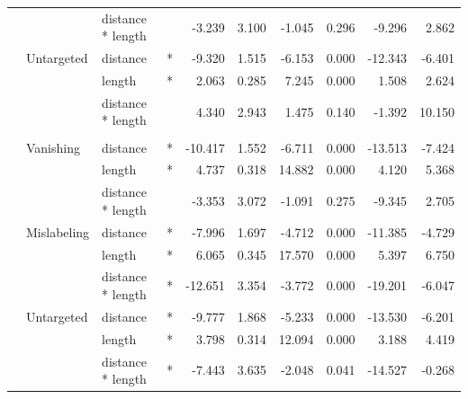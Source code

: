 \documentclass[
]{article}
\begin{document}
\begin{longtable}[t]{llllrrrrrr}
\cmidrule{3-10}\nopagebreak
\hspace{1em} &  & distance * length &  & -3.239 & 3.100 & -1.045 & 0.296 & -9.296 & 2.862\\
\cmidrule{2-10}\nopagebreak
\hspace{1em} & Untargeted & distance & * & -9.320 & 1.515 & -6.153 & 0.000 & -12.343 & -6.401\\
\cmidrule{3-10}\nopagebreak
\hspace{1em} &  & length & * & 2.063 & 0.285 & 7.245 & 0.000 & 1.508 & 2.624\\
\cmidrule{3-10}\nopagebreak
\hspace{1em} &  & distance * length &  & 4.340 & 2.943 & 1.475 & 0.140 & -1.392 & 10.150\\
\cmidrule{1-10}\pagebreak[0]
\addlinespace[0.3em]
\multicolumn{10}{l}{\textbf{SSD}}\\
\hspace{1em} & Vanishing & distance & * & -10.417 & 1.552 & -6.711 & 0.000 & -13.513 & -7.424\\
\cmidrule{3-10}\nopagebreak
\hspace{1em} &  & length & * & 4.737 & 0.318 & 14.882 & 0.000 & 4.120 & 5.368\\
\cmidrule{3-10}\nopagebreak
\hspace{1em} &  & distance * length &  & -3.353 & 3.072 & -1.091 & 0.275 & -9.345 & 2.705\\
\cmidrule{2-10}\nopagebreak
\hspace{1em} & Mislabeling & distance & * & -7.996 & 1.697 & -4.712 & 0.000 & -11.385 & -4.729\\
\cmidrule{3-10}\nopagebreak
\hspace{1em} &  & length & * & 6.065 & 0.345 & 17.570 & 0.000 & 5.397 & 6.750\\
\cmidrule{3-10}\nopagebreak
\hspace{1em} &  & distance * length & * & -12.651 & 3.354 & -3.772 & 0.000 & -19.201 & -6.047\\
\cmidrule{2-10}\nopagebreak
\hspace{1em} & Untargeted & distance & * & -9.777 & 1.868 & -5.233 & 0.000 & -13.530 & -6.201\\
\cmidrule{3-10}\nopagebreak
\hspace{1em} &  & length & * & 3.798 & 0.314 & 12.094 & 0.000 & 3.188 & 4.419\\
\cmidrule{3-10}\nopagebreak
\hspace{1em} &  & distance * length & * & -7.443 & 3.635 & -2.048 & 0.041 & -14.527 & -0.268\\

\end{longtable}
\end{document}
